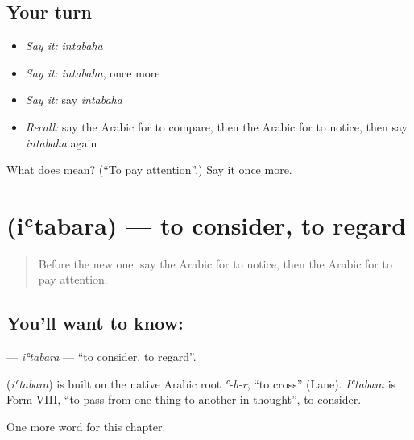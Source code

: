 \subsection*{Your turn}
\begin{itemize}
\raggedright
  \item \emph{Say it:} \emph{intabaha}
  \item \emph{Say it:} \emph{intabaha}, once more
  \item \emph{Say it:} say \emph{intabaha}
  \item \emph{Recall:} say the Arabic for to compare, then the Arabic for to notice, then say \emph{intabaha} again
\end{itemize}

\begin{tcolorbox}[breakable,colback=teal!4,colframe=teal!35!black,title={Before you move on}]
What does  mean? (\textquotedblleft{}To pay attention\textquotedblright{}.) Say it once more.
\end{tcolorbox}
\section[\texorpdfstring{\ar{اعتبر} (iʿtabara)}{اعتبر (iʿtabara)}]{ (iʿtabara) — to consider, to regard}

\label{lesson:AR-C197-itabara}



\begin{quote}
Before the new one: say the Arabic for to notice, then the Arabic for to pay attention.
\end{quote}

\subsection*{You'll want to know: }
\textbf{} — \emph{iʿtabara} — \textquotedblleft{}to consider, to regard\textquotedblright{}.

\begin{cousinweb}
\textbf{} (\emph{iʿtabara}) is built on the native Arabic root \emph{ʿ-b-r}, \textquotedblleft{}to cross\textquotedblright{} (Lane). \emph{Iʿtabara} is Form VIII, \textquotedblleft{}to pass from one thing to another in thought\textquotedblright{}, to consider.
\end{cousinweb}

\begin{grammarlens}[title={What you've built}]
One more word for this chapter.
\end{grammarlens}

